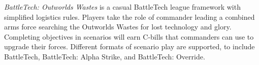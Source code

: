 \emph{BattleTech: Outworlds Wastes} is a casual BattleTech league framework with simplified logistics rules.
Players take the role of commander leading a combined arms force searching the Outworlds Wastes for lost technology and glory.
Completing objectives in scenarios will earn C-bills that commanders can use to upgrade their forces.
Different formats of scenario play are supported, to include BattleTech, BattleTech: Alpha Strike, and BattleTech: Override.
